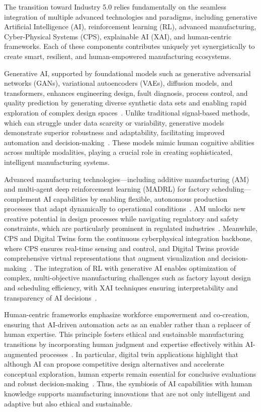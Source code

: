 \documentclass[sigconf]{acmart}
\begin{document}
The transition toward Industry 5.0 relies fundamentally on the seamless integration of multiple advanced technologies and paradigms, including generative Artificial Intelligence (AI), reinforcement learning (RL), advanced manufacturing, Cyber-Physical Systems (CPS), explainable AI (XAI), and human-centric frameworks. Each of these components contributes uniquely yet synergistically to create smart, resilient, and human-empowered manufacturing ecosystems.

Generative AI, supported by foundational models such as generative adversarial networks (GANs), variational autoencoders (VAEs), diffusion models, and transformers, enhances engineering design, fault diagnosis, process control, and quality prediction by generating diverse synthetic data sets and enabling rapid exploration of complex design spaces~\cite{ref1}. Unlike traditional signal-based methods, which can struggle under data scarcity or variability, generative models demonstrate superior robustness and adaptability, facilitating improved automation and decision-making~\cite{ref4}. These models mimic human cognitive abilities across multiple modalities, playing a crucial role in creating sophisticated, intelligent manufacturing systems.

Advanced manufacturing technologies—including additive manufacturing (AM) and multi-agent deep reinforcement learning (MADRL) for factory scheduling—complement AI capabilities by enabling flexible, autonomous production processes that adapt dynamically to operational conditions~\cite{ref16,ref23}. AM unlocks new creative potential in design processes while navigating regulatory and safety constraints, which are particularly prominent in regulated industries~\cite{ref16}. Meanwhile, CPS and Digital Twins form the continuous cyberphysical integration backbone, where CPS ensures real-time sensing and control, and Digital Twins provide comprehensive virtual representations that augment visualization and decision-making~\cite{ref23}. The integration of RL with generative AI enables optimization of complex, multi-objective manufacturing challenges such as factory layout design and scheduling efficiency, with XAI techniques ensuring interpretability and transparency of AI decisions~\cite{ref12}.

Human-centric frameworks emphasize workforce empowerment and co-creation, ensuring that AI-driven automation acts as an enabler rather than a replacer of human expertise. This principle fosters ethical and sustainable manufacturing transitions by incorporating human judgment and expertise effectively within AI-augmented processes~\cite{ref2}. In particular, digital twin applications highlight that although AI can propose competitive design alternatives and accelerate conceptual exploration, human experts remain essential for conclusive evaluations and robust decision-making~\cite{ref2}. Thus, the symbiosis of AI capabilities with human knowledge supports manufacturing innovations that are not only intelligent and adaptive but also ethical and sustainable.
\end{document}
